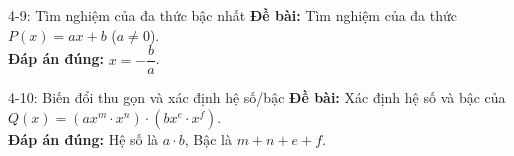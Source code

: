 \documentclass[11pt, a4paper]{article}
\begin{document}
\begin{qbox}{4-9: Tìm nghiệm của đa thức bậc nhất}
\textbf{Đề bài:} Tìm nghiệm của đa thức $P(x) = a x + b$ ($a \neq 0$). \\[0.3em]
\textbf{Đáp án đúng:} $x = -\dfrac{b}{a}$.
\end{qbox}

\begin{qbox}{4-10: Biến đổi thu gọn và xác định hệ số/bậc}
\textbf{Đề bài:} Xác định hệ số và bậc của $Q(x) = (a x^m \cdot x^n) \cdot (b x^e \cdot x^f)$. \\[0.3em]
\textbf{Đáp án đúng:} Hệ số là $a \cdot b$, Bậc là $m + n + e + f$.
\end{qbox}
\end{document}
